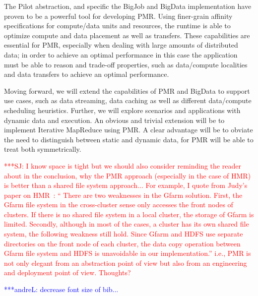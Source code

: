 \documentclass{acm_proc_article-sp}
\newcommand{\jhanote}[1]{ {\textcolor{red} { ***SJ: #1 }}}
\newcommand{\alnote}[1]{ {\textcolor{blue} { ***andreL: #1 }}}
\newcommand{\alnote}[1]{}
\newcommand{\jhanote}[1]{}
\newcommand{\upp}{\vspace*{-0.5em}}
\begin{document}

The Pilot abstraction, and specific the BigJob and BigData
implementation have proven to be a powerful tool for developing
PMR. Using finer-grain affinity specifications for compute/data units
and resources, the runtime is able to optimize compute and data
placement as well as transfers. These capabilities are essential for
PMR, especially when dealing with large amounts of distributed data;
in order to achieve an optimal performance in this case the
application must be able to reason and trade-off properties, such as
data/compute localities and data transfers to achieve an optimal
performance.

Moving forward, we will extend the capabilities of PMR and BigData to
support use cases, such as data streaming, data caching as well as
different data/compute scheduling heuristics. Further, we will explore
scenarios and applications with dynamic data and execution. An obvious
and trivial extension will be to implement Iterative MapReduce using
PMR. A clear advantage will be to obviate the need to distinguish
between static and dynamic data, for PMR will be able to treat both
symmetrically.  \upp


\jhanote{I know space is tight but we should also consider reminding
  the reader about in the conclusion, why the PMR approach (especially
  in the case of HMR) is better than a shared file system approach...
  For example, I quote from Judy's paper on HMR~\cite{ecmls11-mr-autodock}: `` There are two
  weaknesses in the Gfarm solution. First, the Gfarm file system in
  the cross-cluster sense only accesses the front nodes of
  clusters. If there is no shared file system in a local cluster, the
  storage of Gfarm is limited. Secondly, although in most of the
  cases, a cluster has its own shared file system, the following
  weakness still hold. Since Gfarm and HDFS use separate directories
  on the front node of each cluster, the data copy operation between
  Gfarm file system and HDFS is unavoidable in our implementation.''
  i.e., PMR is not only elegant from an abstraction point of view but
  also from an engineering and deployment point of view. Thoughts?}


\alnote{decrease font size of bib...}


%
{\footnotesize } %
%
%
\end{document}
